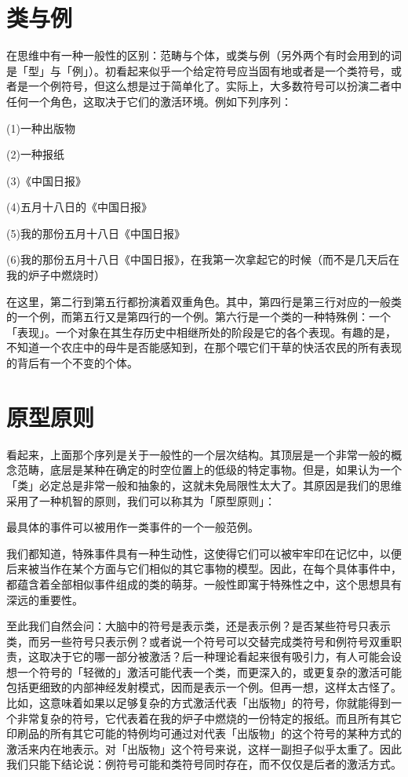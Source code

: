 \documentclass[
  12pt,
  twoside,
  openright,
  oldfontcommands,
]{memoir}
\begin{document}
\section{类与例}

在思维中有一种一般性的区别：范畴与个体，或类与例（另外两个有时会用到的词是「型」与「例」）。初看起来似乎一个给定符号应当固有地或者是一个类符号，或者是一个例符号，但这么想是过于简单化了。实际上，大多数符号可以扮演二者中任何一个角色，这取决于它们的激活环境。例如下列序列：

(1)一种出版物

(2)一种报纸

(3)《中国日报》

(4)五月十八日的《中国日报》

(5)我的那份五月十八日《中国日报》

(6)我的那份五月十八日《中国日报》，在我第一次拿起它的时候（而不是几天后在我的炉子中燃烧时）

在这里，第二行到第五行都扮演着双重角色。其中，第四行是第三行对应的一般类的一个例，而第五行又是第四行的一个例。第六行是一个类的一种特殊例：一个「表现」。一个对象在其生存历史中相继所处的阶段是它的各个表现。有趣的是，不知道一个农庄中的母牛是否能感知到，在那个喂它们干草的快活农民的所有表现的背后有一个不变的个体。

\section{原型原则}

看起来，上面那个序列是关于一般性的一个层次结构。其顶层是一个非常一般的概念范畴，底层是某种在确定的时空位置上的低级的特定事物。但是，如果认为一个「类」必定总是非常一般和抽象的，这就未免局限性太大了。其原因是我们的思维采用了一种机智的原则，我们可以称其为「原型原则」：

{最具体的事件可以被用作一类事件的一个一般范例。}

我们都知道，特殊事件具有一种生动性，这使得它们可以被牢牢印在记忆中，以便后来被当作在某个方面与它们相似的其它事物的模型。因此，在每个具体事件中，都蕴含着全部相似事件组成的类的萌芽。一般性即寓于特殊性之中，这个思想具有深远的重要性。

至此我们自然会问：大脑中的符号是表示类，还是表示例？是否某些符号只表示类，而另一些符号只表示例？或者说一个符号可以交替完成类符号和例符号双重职责，这取决于它的哪一部分被激活？后一种理论看起来很有吸引力，有人可能会设想一个符号的「轻微的」激活可能代表一个类，而更深入的，或更复杂的激活可能包括更细致的内部神经发射模式，因而是表示一个例。但再一想，这样太古怪了。比如，这意味着如果以足够复杂的方式激活代表「出版物」的符号，你就能得到一个非常复杂的符号，它代表着在我的炉子中燃烧的一份特定的报纸。而且所有其它印刷品的所有其它可能的特例均可通过对代表「出版物」的这个符号的某种方式的激活来内在地表示。对「出版物」这个符号来说，这样一副担子似乎太重了。因此我们只能下结论说：例符号可能和类符号同时存在，而不仅仅是后者的激活方式。
\end{document}

